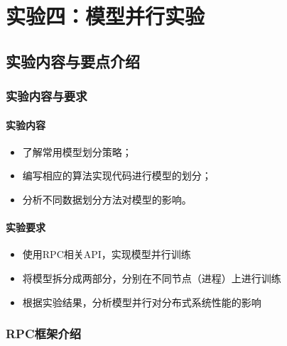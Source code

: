 \chapter{实验四：模型并行实验}

\section{实验内容与要点介绍}

\subsection{实验内容与要求}
\subsubsection{实验内容}
\begin{itemize}
    \item 了解常用模型划分策略；
    \item 编写相应的算法实现代码进行模型的划分；
    \item 分析不同数据划分方法对模型的影响。
\end{itemize}

\subsubsection{实验要求}
\begin{itemize}
    \item 使用RPC相关API，实现模型并行训练
    \item 将模型拆分成两部分，分别在不同节点（进程）上进行训练
    \item 根据实验结果，分析模型并行对分布式系统性能的影响
\end{itemize}

\subsection{RPC框架介绍}

